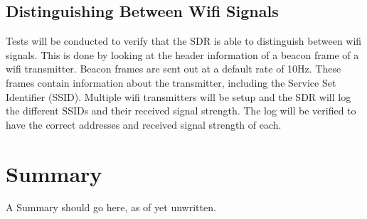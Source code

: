 \subsection{Distinguishing Between Wifi Signals}
Tests will be conducted to verify that the SDR is able to distinguish between wifi signals. This is done by looking at the header information of a beacon frame of a wifi transmitter. Beacon frames are sent out at a default rate of 10Hz. These frames contain information about the transmitter, including the Service Set Identifier (SSID). Multiple wifi transmitters will be setup and the SDR will log the different SSIDs and their received signal strength. The log will be verified to have the correct addresses and received signal strength of each. 

\section{Summary}
A Summary should go here, as of yet unwritten.